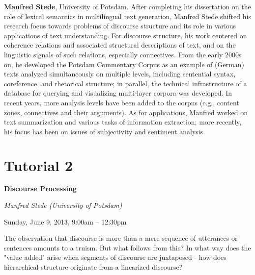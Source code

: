 \begin{bio}
\setlength{\parskip}{1ex}

\noindent
{\bfseries Manfred Stede}, University of Potsdam. After completing his dissertation on the role of lexical semantics in multilingual text generation, Manfred Stede shifted his research focus towards problems of discourse structure and its role in various applications of text understanding. For discourse structure, his work centered on coherence relations and associated structural descriptions of text, and on the linguistic signals of such relations, especially connectives. From the early 2000s on, he developed the Potsdam Commentary Corpus as an example of (German) texts analyzed simultaneously on multiple levels, including sentential syntax, coreference, and rhetorical structure; in parallel, the technical infrastructure of a database for querying and visualizing multi-layer corpora was developed. In recent years, more analysis levels have been added to the corpus (e.g., content zones, connectives and their arguments). As for applications, Manfred worked on text summarization and various tasks of information extraction; more recently, his focus has been on issues of subjectivity and sentiment analysis.
\end{bio}

\section%
    [\textbf{T2:} Discourse Processing (M. Stede)]
    {Tutorial 2}
\label{TutV}
\begin{center}
\begin{Large}
\bfseries Discourse Processing\\ \vspace{2em}\par
\end{Large}

{\itshape Manfred Stede (University of Potsdam)}\vspace{1em}\par
Sunday, June 9, 2013, 9:00am -- 12:30pm \vspace{1em}\\
\TutLocB
\end{center}

The observation that discourse is more than a mere sequence of utterances or sentences amounts to a truism. But what follows from this? In what way does the "value added" arise when segments of discourse are juxtaposed - how does hierarchical structure originate from a linearized discourse?

